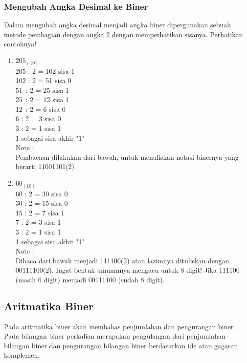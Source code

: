 \begin{enumerate}[label=(\alph*)]
\subsubsection {Mengubah Angka Desimal ke Biner}


\qquad Dalam mengubah angka desimal menjadi angka biner dipergunakan sebuah metode pembagian dengan angka 2 dengan memperhatikan sisanya.
Perhatikan contohnya!
\begin{enumerate}
\item $205_{(10)}$\\
205 : 2 = 102 sisa 1\\
102 : 2 = 51 sisa 0 \\
51 \,: 2 = 25 sisa 1\\
25 \,: 2 = 12 sisa 1 \\
12 \,: 2 = 6 sisa 0 \\
6 \quad : 2 = 3 sisa 0 \\
3 \quad : 2 = 1 sisa 1 \\
1  sebagai sisa akhir "1"\\

Note :\\
Pembacaan dilakukan dari bawah, untuk menuliskan notasi binernya yang berarti 11001101(2) \\

\item $60_{(10)}$\\
60 : 2 = 30 sisa 0\\
30 : 2 = 15 sisa 0 \\
15 : 2 = 7 sisa 1 \\
7   : 2 = 3 sisa 1 \\
3   : 2 = 1 sisa 1 \\
1  sebagai sisa akhir "1"\\

Note :\\
Dibaca dari bawah menjadi 111100(2) atau lazimnya dituliskan dengan 00111100(2). Ingat bentuk umumnnya mengacu untuk 8 digit! Jika 111100 (masih 6 digit) menjadi 00111100 (sudah 8 digit).

\end{enumerate}

\subsection{Aritmatika Biner}

\qquad Pada aritmatika biner akan membahas penjumlahan dan pengurangan biner. Pada bilangan biner perkalian merupakan pengulangan dari penjumlahan bilangan biner dan pengurangan bilangan biner berdasarkan ide atau gagasan komplemen.


\end{enumerate}
